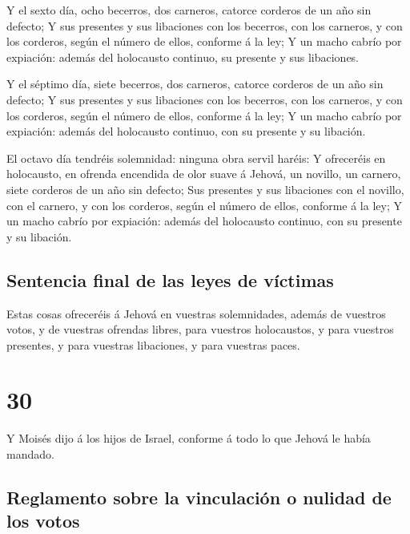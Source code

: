  Y el sexto día, ocho becerros, dos carneros, catorce
corderos de un año sin defecto;  Y sus presentes y sus
libaciones con los becerros, con los carneros, y con los corderos, según
el número de ellos, conforme á la ley;  Y un macho cabrío
por expiación: además del holocausto continuo, su presente y sus
libaciones.

 Y el séptimo día, siete becerros, dos carneros, catorce
corderos de un año sin defecto;  Y sus presentes y sus
libaciones con los becerros, con los carneros, y con los corderos, según
el número de ellos, conforme á la ley;  Y un macho cabrío
por expiación: además del holocausto continuo, con su presente y su
libación.

 El octavo día tendréis solemnidad: ninguna obra servil
haréis:  Y ofreceréis en holocausto, en ofrenda encendida
de olor suave á Jehová, un novillo, un carnero, siete corderos de un año
sin defecto;  Sus presentes y sus libaciones con el
novillo, con el carnero, y con los corderos, según el número de ellos,
conforme á la ley;  Y un macho cabrío por expiación:
además del holocausto continuo, con su presente y su libación.

\hypertarget{sentencia-final-de-las-leyes-de-vuxedctimas}{%
\subsection{Sentencia final de las leyes de
víctimas}\label{sentencia-final-de-las-leyes-de-vuxedctimas}}

 Estas cosas ofreceréis á Jehová en vuestras
solemnidades, además de vuestros votos, y de vuestras ofrendas libres,
para vuestros holocaustos, y para vuestros presentes, y para vuestras
libaciones, y para vuestras paces. 

\hypertarget{section-29}{%
\section{30}\label{section-29}}

 Y Moisés dijo á los hijos de Israel, conforme á todo lo
que Jehová le había mandado.

\hypertarget{reglamento-sobre-la-vinculaciuxf3n-o-nulidad-de-los-votos}{%
\subsection{Reglamento sobre la vinculación o nulidad de los
votos}\label{reglamento-sobre-la-vinculaciuxf3n-o-nulidad-de-los-votos}}

